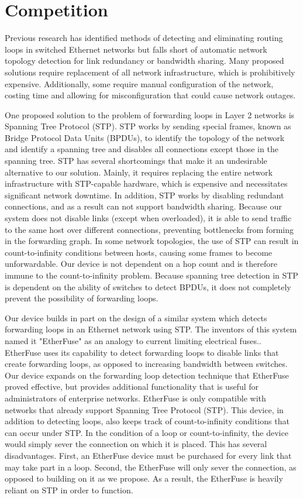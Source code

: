 \documentclass{article}
\begin{document}
\section{Competition}
	Previous research has identified methods of detecting and eliminating routing loops in switched Ethernet networks but falls short of automatic network topology detection for link redundancy or bandwidth sharing.
	Many proposed solutions require replacement of all network infrastructure, which is prohibitively expensive.
	Additionally, some require manual configuration of the network, costing time and allowing for misconfiguration that could cause network outages.
	
	One proposed solution to the problem of forwarding loops in Layer 2 networks is Spanning Tree Protocol (STP).
	STP works by sending special frames, known as Bridge Protocol Data Units (BPDUs), to identify the topology of the network and identify a spanning tree and disables all connections except those in the spanning tree.
	STP has several shortcomings that make it an undesirable alternative to our solution.
	Mainly, it requires replacing the entire network infrastructure with STP-capable hardware, which is expensive and necessitates significant network downtime.
	In addition, STP works by disabling redundant connections, and as a result can not support bandwidth sharing.
	Because our system does not disable links (except when overloaded), it is able to send traffic to the same host over different connections, preventing bottlenecks from forming in the forwarding graph.
  In some network topologies, the use of STP can result in count-to-infinity conditions between hosts, causing some frames to become unforwardable.
  Our device is not dependent on a hop count and is therefore immune to the count-to-infinity problem.
	Because spanning tree detection in STP is dependent on the ability of switches to detect BPDUs, it does not completely prevent the possibility of forwarding loops.
	
	Our device builds in part on the design of a similar system which detects forwarding loops in an Ethernet network using STP.
	The inventors of this system named it "EtherFuse" as an analogy to current limiting electrical fuses.\cite{etherfuse}.
	EtherFuse uses its capability to detect forwarding loops to disable links that create forwarding loops, as opposed to increasing bandwidth between switches.
	Our device expands on the forwarding loop detection technique that EtherFuse proved effective, but provides additional functionality that is useful for administrators of enterprise networks.
	EtherFuse is only compatible with networks that already support Spanning Tree Protocol (STP).
	This device, in addition to detecting loops, also keeps track of count-to-infinity conditions that can occur under STP.
	In the condition of a loop or count-to-infinity, the device would simply sever the connection on which it is placed.
	This has several disadvantages.
	First, an EtherFuse device must be purchased for every link that may take part in a loop.
	Second, the EtherFuse will only sever the connection, as opposed to building on it as we propose.
	As a result, the EtherFuse is heavily reliant on STP in order to function.
	
\end{document}
